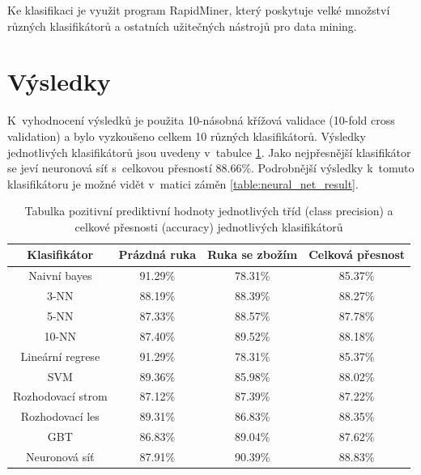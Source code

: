 Ke klasifikaci je využit program RapidMiner, který poskytuje velké množství různých klasifikátorů a ostatních užitečných nástrojů pro data mining. 

\section{Výsledky}
K~vyhodnocení výsledků je použita 10-násobná křížová validace (10-fold cross validation) a bylo vyzkoušeno celkem 10 různých klasifikátorů. Výsledky jednotlivých klasifikátorů jsou uvedeny v~tabulce \ref{table:classificators_result}. Jako nejpřesnější klasifikátor se jeví neuronová síť s~celkovou přesností 88.66\%. Podrobnější výsledky k~tomuto klasifikátoru je možné vidět v~matici záměn \ref{table:neural_net_result}.

\begin{table}[h]
  \centering
  \begin{tabular}{|c|c|c|c|}
  \hline
  \rowcolor{Blue}
  \color{White}\textbf{Klasifikátor} & \color{White}\textbf{Prázdná ruka} & \color{White}\textbf{Ruka se zbožím} & \color{White}\textbf{Celková přesnost} \\ \hline
  Naivní bayes & 91.29\% & 78.31\% & 85.37\% \\ \hline
  3-NN & 88.19\% & 88.39\% & 88.27\% \\ \hline
  5-NN & 87.33\% & 88.57\% & 87.78\%\\ \hline
  10-NN & 87.40\% & 89.52\% & 88.18\% \\ \hline
  Lineární regrese & 91.29\% & 78.31\% & 85.37\% \\ \hline
  SVM & 89.36\% & 85.98\% & 88.02\% \\ \hline
  Rozhodovací strom & 87.12\% & 87.39\% & 87.22\%  \\ \hline
  Rozhodovací les & 89.31\% & 86.83\% & 88.35\% \\ \hline
  GBT & 86.83\% & 89.04\% & 87.62\%  \\ \hline
  Neuronová síť & 87.91\% & 90.39\% & 88.83\% \\ \hline
  \end{tabular}
  \caption{Tabulka pozitivní prediktivní hodnoty jednotlivých tříd (class precision) a celkové přesnosti (accuracy) jednotlivých klasifikátorů}
  \label{table:classificators_result}
\end{table}


